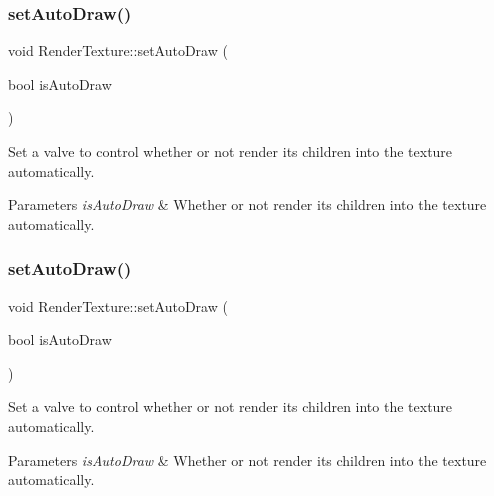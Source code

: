 \subsubsection{\texorpdfstring{set\+Auto\+Draw()}{setAutoDraw()}\hspace{0.1cm}{\footnotesize\ttfamily [1/2]}}
{\footnotesize\ttfamily void Render\+Texture\+::set\+Auto\+Draw (\begin{DoxyParamCaption}\item[{bool}]{is\+Auto\+Draw }\end{DoxyParamCaption})\hspace{0.3cm}{\ttfamily [inline]}}

Set a valve to control whether or not render its children into the texture automatically.


\begin{DoxyParams}{Parameters}
{\em is\+Auto\+Draw} & Whether or not render its children into the texture automatically. \\
\hline
\end{DoxyParams}
\mbox{\label{classRenderTexture_af41afca2870fc8b26f4fec8d6ff89a3e}} 
\subsubsection{\texorpdfstring{set\+Auto\+Draw()}{setAutoDraw()}\hspace{0.1cm}{\footnotesize\ttfamily [2/2]}}
{\footnotesize\ttfamily void Render\+Texture\+::set\+Auto\+Draw (\begin{DoxyParamCaption}\item[{bool}]{is\+Auto\+Draw }\end{DoxyParamCaption})\hspace{0.3cm}{\ttfamily [inline]}}

Set a valve to control whether or not render its children into the texture automatically.


\begin{DoxyParams}{Parameters}
{\em is\+Auto\+Draw} & Whether or not render its children into the texture automatically. \\
\hline
\end{DoxyParams}
\mbox{\label{classRenderTexture_af4a8bbb32af1b96a23a28389b7c564d6}} 
